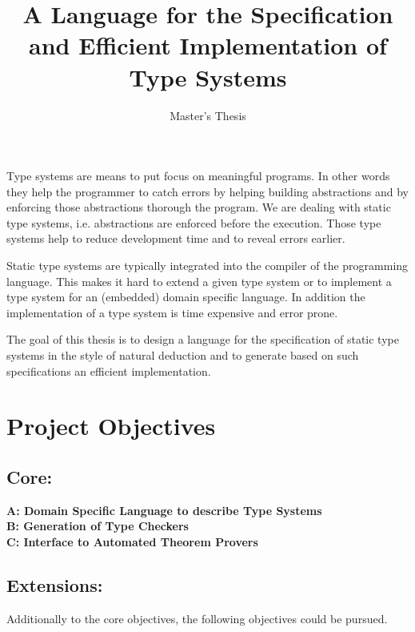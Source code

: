\documentclass{scrartcl}
\title{A Language for the Specification and Efficient Implementation
  of Type Systems}
\subtitle{Master's Thesis}
\begin{document}
\maketitle
{}

Type systems are means to put focus on meaningful programs. In other
words they help the programmer to catch errors by helping building
abstractions and by enforcing those abstractions thorough the
program. We are dealing with static type systems, i.e. abstractions
are enforced before the execution. Those type systems help to reduce
development time and to reveal errors earlier. 

Static type systems are typically integrated into the compiler of the
programming language.  This makes it hard to extend a
given type system or to implement a type system for an (embedded)
domain specific language. In addition the implementation of a type
system is time expensive and error prone.

The goal of this thesis is to design a language for the specification
of static type systems in the style of natural deduction and to
generate based on such specifications an efficient implementation.

\section{Project Objectives}

\subsection{Core:}
\begin{description}
\item[{\bf A: Domain Specific Language to describe Type Systems}]
\item[{\bf B: Generation of Type Checkers}]
\item[{\bf C: Interface to Automated Theorem Provers}]
\end{description}

\subsection{Extensions:}

Additionally to the core objectives, the following objectives could be
pursued.
\end{document}
